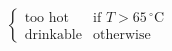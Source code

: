 \[
    \begin{cases}
        \text{too hot} & \text{if } T > 65\,^{\circ}\mathrm{C} \\
        \text{drinkable} & \text{otherwise}
    \end{cases}
\]
